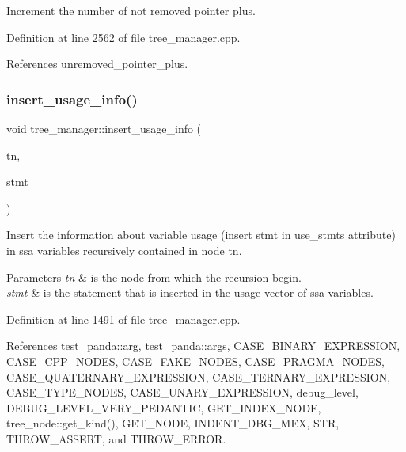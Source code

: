 Increment the number of not removed pointer plus. 



Definition at line 2562 of file tree\+\_\+manager.\+cpp.



References unremoved\+\_\+pointer\+\_\+plus.

\mbox{\label{classtree__manager_a3508317581f7ae086d2656abb90108e0}} 
\subsubsection{\texorpdfstring{insert\+\_\+usage\+\_\+info()}{insert\_usage\_info()}}
{\footnotesize\ttfamily void tree\+\_\+manager\+::insert\+\_\+usage\+\_\+info (\begin{DoxyParamCaption}\item[{const \hyperlink{tree__node_8hpp_a6ee377554d1c4871ad66a337eaa67fd5}{tree\+\_\+node\+Ref} \&}]{tn,  }\item[{const \hyperlink{tree__node_8hpp_a6ee377554d1c4871ad66a337eaa67fd5}{tree\+\_\+node\+Ref} \&}]{stmt }\end{DoxyParamCaption})\hspace{0.3cm}{\ttfamily [private]}}



Insert the information about variable usage (insert stmt in use\+\_\+stmts attribute) in ssa variables recursively contained in node tn. 


\begin{DoxyParams}{Parameters}
{\em tn} & is the node from which the recursion begin. \\
\hline
{\em stmt} & is the statement that is inserted in the usage vector of ssa variables. \\
\hline
\end{DoxyParams}


Definition at line 1491 of file tree\+\_\+manager.\+cpp.



References test\+\_\+panda\+::arg, test\+\_\+panda\+::args, C\+A\+S\+E\+\_\+\+B\+I\+N\+A\+R\+Y\+\_\+\+E\+X\+P\+R\+E\+S\+S\+I\+ON, C\+A\+S\+E\+\_\+\+C\+P\+P\+\_\+\+N\+O\+D\+ES, C\+A\+S\+E\+\_\+\+F\+A\+K\+E\+\_\+\+N\+O\+D\+ES, C\+A\+S\+E\+\_\+\+P\+R\+A\+G\+M\+A\+\_\+\+N\+O\+D\+ES, C\+A\+S\+E\+\_\+\+Q\+U\+A\+T\+E\+R\+N\+A\+R\+Y\+\_\+\+E\+X\+P\+R\+E\+S\+S\+I\+ON, C\+A\+S\+E\+\_\+\+T\+E\+R\+N\+A\+R\+Y\+\_\+\+E\+X\+P\+R\+E\+S\+S\+I\+ON, C\+A\+S\+E\+\_\+\+T\+Y\+P\+E\+\_\+\+N\+O\+D\+ES, C\+A\+S\+E\+\_\+\+U\+N\+A\+R\+Y\+\_\+\+E\+X\+P\+R\+E\+S\+S\+I\+ON, debug\+\_\+level, D\+E\+B\+U\+G\+\_\+\+L\+E\+V\+E\+L\+\_\+\+V\+E\+R\+Y\+\_\+\+P\+E\+D\+A\+N\+T\+IC, G\+E\+T\+\_\+\+I\+N\+D\+E\+X\+\_\+\+N\+O\+DE, tree\+\_\+node\+::get\+\_\+kind(), G\+E\+T\+\_\+\+N\+O\+DE, I\+N\+D\+E\+N\+T\+\_\+\+D\+B\+G\+\_\+\+M\+EX, S\+TR, T\+H\+R\+O\+W\+\_\+\+A\+S\+S\+E\+RT, and T\+H\+R\+O\+W\+\_\+\+E\+R\+R\+OR.



